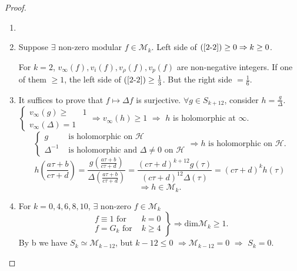\begin{proof}
  \begin{enumerate}
    \item []
    \item Suppose $\exists$ non-zero modular $f\in \mathcal{M}_k$. Left side of $(\ref{2-2})\ge 0 \Rightarrow k\ge 0$.

      For $k=2$,  $v_{\infty}(f),v_i(f),v_\rho(f),v_p(f)$ are non-negative integers. If one of them $\ge 1$, the left side of $(\ref{2-2})\ge  \frac{1}{3}$. But the right side $=\frac{1}{6}$.
    \item It suffices to prove that $f\mapsto \Delta f$ is surjective. $\forall g\in S_{k+12}$, consider $h=\frac{g}{\Delta}$. $\left\{\begin{matrix} v_{\infty}(g)\ge &1\\v_{\infty}(\Delta)=1\end{matrix}\right. \Rightarrow v_{\infty}(h)\ge 1$ $\Rightarrow$ $h$ is holomorphic at $\infty$. 
      \[
      \left\{ 
	\begin{aligned}
	  g &\text{ is holomorphic on }\mathcal{H}\\
	\Delta^{-1}& \text{ is holomorphic and } \Delta\neq 0 \text{ on }\mathcal{H}
	\end{aligned}\right.\Rightarrow  h  \text{ is holomorphic on }\mathcal{H}.
      \]
      \[
	h\left( \frac{a\tau+b}{c\tau+d} \right) =\frac{g\left( \frac{a\tau+b}{c\tau+d} \right) }{\Delta\left( \frac{a\tau+b}{c\tau+d} \right) }=\frac{(c\tau+d)^{k+12}g(\tau)}{(c\tau+d)^{12}\Delta(\tau)}=(c\tau+d)^{k}h(\tau)
      \] 
      \[
      \Rightarrow h\in \mathcal{M}_k.
      \]
    \item For $k=0,4,6,8,10$,  $\exists $ non-zero $f\in \mathcal{M}_k$ 
      \[
     \left. \begin{aligned}
	f\equiv 1 \text{ for }&k=0\\
	f=G_{k} \text{ for }&k\ge 4
    \end{aligned}\right\}\Rightarrow \mathrm{dim}\mathcal{M}_k\ge 1.
      \] 
      By b we have $S_{k}\simeq \mathcal{M}_{k-12}$, but $k-12\le 0$ $\Rightarrow \mathcal{M}_{k-12}=0$ $\Rightarrow$ $S_k=0$. 
  \end{enumerate}
\end{proof}

